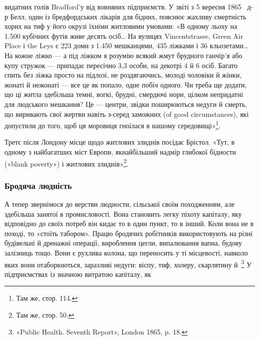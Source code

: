 видатних голів Bradford’у від вовняних підприємств. У звіті
з 5 вересня 1865~ д-р Белл, один із бредфордських лікарів для
бідних, пояснює жахливу смертність хорих на тиф у його окрузі
їхніми житловими умовами: «В одному льоху на \num{1.500} кубічних
футів живе десять осіб\dots{} На вулицях Vincentstrasse, Green
Air Place і the Leys є 223 доми з \num{1.450} мешканцями, 435 ліжками
і 36 кльозетами\dots{} На кожне ліжко — а під ліжком я розумію
всякий жмут брудного ганчір’я або купу стружок — припадає
пересічно 3,3 особи, на декотрі 4 й 6 осіб. Багато спить без ліжка
просто на підлозі, не роздягаючись, молоді чоловіки й жінки,
жонаті й нежонаті — все це як попало, одне побіч одного. Чи
треба ще додати, що ці житла здебільша темні, вогкі, брудні,
смердючі нори, цілком непридатні для людського мешкання?
Це — центри, звідки поширюються недуги й смерть, що виривають
свої жертви навіть з-серед заможних (of good circumstances),
які допустили до того, щоб ця моровиця гноїлася в нашому
середовищі»\footnote{
Там же, стор. 114.
}.

Третє після Лондону місце щодо житлових злиднів посідає
Брістол. «Тут, в одному з найбагатших міст Европи, якнайбільший
надмір глибокої бідности («blank poverty») і житлових
злиднів»\footnote{
Там же, стор. 50.
}.

\subsubsection{Бродяча людність}

А тепер звернімося до верстви людности, сільської своїм походженням,
але здебільша занятої в промисловості. Вона становить
легку піхоту капіталу, яку відповідно до своїх потреб
він кидає то в один пункт, то в інший. Коли вона не в поході,
то «стоїть табором». Працю бродячих робітників використовують
на різні будівельні й дренажні операції, вироблення цегли,
випалювання вапна, будову залізниць тощо. Вони є рухлива
колона, що переносить у ті місцевості, навколо яких вони отаборюються,
заразливі недуги: віспу, тиф, холеру, скарлятину
й~\footnote{
«Public Health. Seventh Report», London 1865, p. 18.
} У підприємствах із значною витратою капіталу, як
\parbreak{}  %
